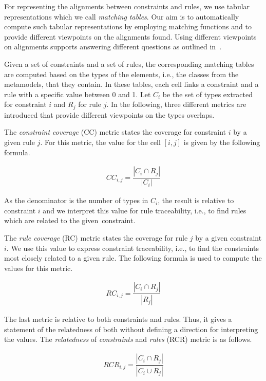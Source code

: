 For representing the alignments between constraints and rules, we use tabular representations which we call \emph{matching tables}. Our aim is to automatically compute such tabular representations by employing matching functions and to provide different viewpoints on the alignments found. Using different viewpoints on alignments supports answering different questions as outlined in~\cite{WongGH00}.

Given a set of constraints and a set of rules, the corresponding matching tables are computed based on the types of the elements, i.e., the classes from the metamodels, that they contain. In these tables, each cell links a constraint and a rule with a  specific value between 0 and 1. Let $C_{i}$ be the set of types extracted for constraint $i$ and $R_{j}$ for rule $j$. In the following, three different metrics are introduced that provide different viewpoints on the types overlaps.

The \emph{constraint coverage} (CC) metric states the coverage for constraint $i$ by a given rule $j$. For this metric, the value for the cell $[i,j]$ is given by the following formula.

\begin{align}
CC_{i,j} = \dfrac{| C_{i} \cap R_{j} |}{| C_{i} |}
\label{for:firstmetric}
\end{align}

As the denominator is the number of types in $C_{i}$, the result is relative to constraint $i$ and we interpret this value for rule traceability, i.e., to find rules which are related to the given~constraint.

The \emph{rule coverage} (RC) metric states the coverage for rule $j$ by a given constraint $i$. We use this value to express constraint traceability, i.e., to find the constraints most closely related to a given rule. The following formula is used to compute the values for this metric.

\begin{align}
RC_{i,j} = \dfrac{| C_{i} \cap R_{j} |}{| R_{j} |}
\label{for:secondmetric}
\end{align}



The last metric is relative to both constraints and rules. Thus, it gives a statement of the relatedness of both without defining a direction for interpreting the values. The  \emph{relatedness} of \emph{constraints} and \emph{rules} (RCR) metric is as follows.

\begin{align}
RCR_{i,j} = \dfrac{| C_{i} \cap R_{j} |}{| C_{i} \cup R_{j} |}
\label{for:thirdmetric}
\end{align}

